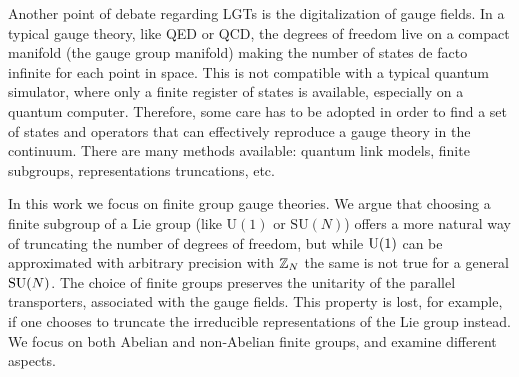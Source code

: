 Another point of debate regarding LGTs is the digitalization of gauge fields.
In a typical gauge theory, like QED or QCD, the degrees of freedom live on a compact manifold (the gauge group manifold) making the number of states de facto infinite for each point in space.
This is not compatible with a typical quantum simulator, where only a finite register of states is available, especially on a quantum computer.
Therefore, some care has to be adopted in order to find a set of states and operators that can effectively reproduce a gauge theory in the continuum.
There are many methods available: quantum link models, finite subgroups, representations truncations, etc.

\bigskip

In this work we focus on finite group gauge theories.
We argue that choosing a finite subgroup of a Lie group (like $\mathrm{U}(1)$ or $\mathrm{SU}(N)$) offers a more natural way of truncating the number of degrees of freedom, but while $\mathrm{U}(1)$ can be approximated with arbitrary precision with $\mathbb{Z}_N$ the same is not true for a general $\text{SU}(N)$.
The choice of finite groups preserves the unitarity of the parallel transporters, associated with the gauge fields.
This property is lost, for example, if one chooses to truncate the irreducible representations of the Lie group instead.
We focus on both Abelian \cite{pradhan2022ladder} and non-Abelian \cite{pradhan_unpublished} finite groups, and examine different aspects.

\bigskip


